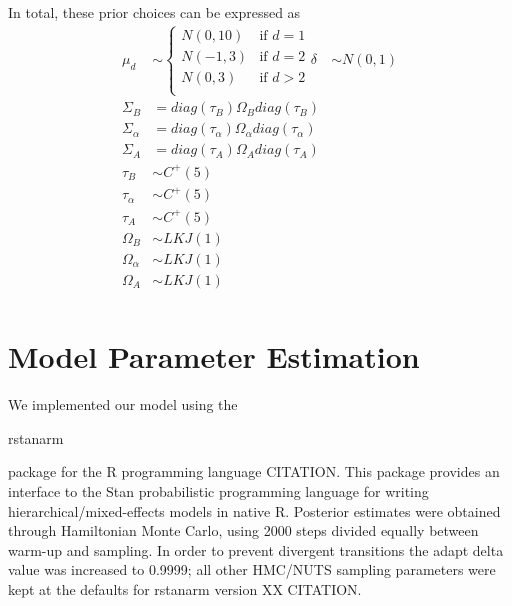 \documentclass[12pt,letterpaper]{article}
\begin{document}
In total, these prior choices can be expressed as
\begin{equation}
  \begin{aligned}
    \mu_{d} &\sim 
      \begin{cases}
        N(0, 10) & \text{if } d = 1 \\
        N(-1, 3) & \text{if } d = 2 \\
        N(0, 3) & \text{if } d > 2 \\
      \end{cases}
    \delta &\sim N(0, 1) \\
    \Sigma_{B} &= diag(\tau_{B}) \Omega_{B} diag(\tau_{B}) \\
    \Sigma_{\alpha} &= diag(\tau_{\alpha}) \Omega_{\alpha} diag(\tau_{\alpha}) \\
    \Sigma_{A} &= diag(\tau_{A}) \Omega_{A} diag(\tau_{A}) \\
    \tau_{B} &\sim C^{+}(5) \\
    \tau_{\alpha} &\sim C^{+}(5) \\
    \tau_{A} &\sim C^{+}(5) \\
    \Omega_{B} &\sim LKJ(1) \\
    \Omega_{\alpha} &\sim LKJ(1) \\
    \Omega_{A} &\sim LKJ(1) \\
  \end{aligned}
  \label{eq:priors}
\end{equation}


\section{Model Parameter Estimation}

We implemented our model using the \begin{texttt}rstanarm\end{texttt} package for the R programming language CITATION. This package provides an interface to the Stan probabilistic programming language for writing hierarchical/mixed-effects models in native R. Posterior estimates were obtained through Hamiltonian Monte Carlo, using 2000 steps divided equally between warm-up and sampling. In order to prevent divergent transitions the adapt delta value was increased to 0.9999; all other HMC/NUTS sampling parameters were kept at the defaults for rstanarm version XX CITATION. 
\end{document}
